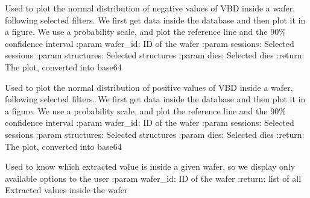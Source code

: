 \documentclass[letterpaper,10pt,english]{sphinxmanual}
\begin{document}
\begin{fulllineitems}
\label{\detokenize{normal_plots:normal_plots.VBD_normal_distrib_neg}}
\pysigstartsignatures
{}
\pysigstopsignatures
\sphinxAtStartPar
Used to plot the normal distribution of negative values of VBD inside a wafer, following selected filters.
We first get data inside the database and then plot it in a figure. We use a probability scale, and plot the reference line and the 90\% confidence interval
:param wafer\_id: ID of the wafer
:param sessions: Selected sessions
:param structures: Selected structures
:param dies: Selected dies
:return: The plot, converted into base64

\end{fulllineitems}


\begin{fulllineitems}
\label{\detokenize{normal_plots:normal_plots.VBD_normal_distrib_pos}}
\pysigstartsignatures
{}
\pysigstopsignatures
\sphinxAtStartPar
Used to plot the normal distribution of positive values of VBD inside a wafer, following selected filters.
We first get data inside the database and then plot it in a figure. We use a probability scale, and plot the reference line and the 90\% confidence interval
:param wafer\_id: ID of the wafer
:param sessions: Selected sessions
:param structures: Selected structures
:param dies: Selected dies
:return: The plot, converted into base64

\end{fulllineitems}


\begin{fulllineitems}
\label{\detokenize{normal_plots:normal_plots.get_values}}
\pysigstartsignatures
{}
\pysigstopsignatures
\sphinxAtStartPar
Used to know which extracted value is inside a given wafer, so we display only available options to the user
:param wafer\_id: ID of the wafer
:return: list of all Extracted values inside the wafer

\end{fulllineitems}
\end{document}

